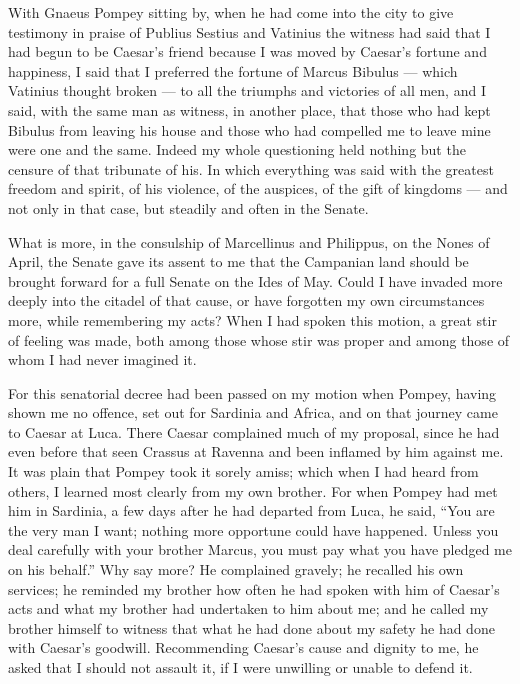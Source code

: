  With Gnaeus Pompey sitting by, when he had come into the city to give testimony in praise of Publius Sestius and Vatinius the witness had said that I had begun to be Caesar's friend because I was moved by Caesar's fortune and happiness, I said that I preferred the fortune of Marcus Bibulus --- which Vatinius thought broken --- to all the triumphs and victories of all men, and I said, with the same man as witness, in another place, that those who had kept Bibulus from leaving his house and those who had compelled me to leave mine were one and the same. Indeed my whole questioning held nothing but the censure of that tribunate of his. In which everything was said with the greatest freedom and spirit, of his violence, of the auspices, of the gift of kingdoms --- and not only in that case, but steadily and often in the Senate.

 What is more, in the consulship of Marcellinus and Philippus, on the Nones of April, the Senate gave its assent to me that the Campanian land should be brought forward for a full Senate on the Ides of May. Could I have invaded more deeply into the citadel of that cause, or have forgotten my own circumstances more, while remembering my acts? When I had spoken this motion, a great stir of feeling was made, both among those whose stir was proper and among those of whom I had never imagined it.

 For this senatorial decree had been passed on my motion when Pompey, having shown me no offence, set out for Sardinia and Africa, and on that journey came to Caesar at Luca. There Caesar complained much of my proposal, since he had even before that seen Crassus at Ravenna and been inflamed by him against me. It was plain that Pompey took it sorely amiss; which when I had heard from others, I learned most clearly from my own brother. For when Pompey had met him in Sardinia, a few days after he had departed from Luca, he said, ``You are the very man I want; nothing more opportune could have happened. Unless you deal carefully with your brother Marcus, you must pay what you have pledged me on his behalf.'' Why say more? He complained gravely; he recalled his own services; he reminded my brother how often he had spoken with him of Caesar's acts and what my brother had undertaken to him about me; and he called my brother himself to witness that what he had done about my safety he had done with Caesar's goodwill. Recommending Caesar's cause and dignity to me, he asked that I should not assault it, if I were unwilling or unable to defend it.

